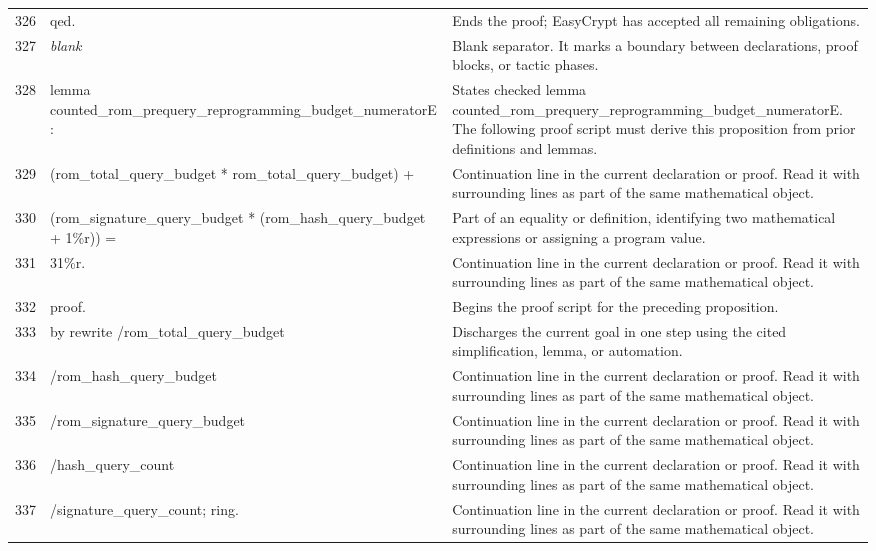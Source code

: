 \documentclass[10pt]{article}
\begin{document}
\begin{longtable}{r L{0.53\textwidth} L{0.37\textwidth}}
326 & {\ttfamily\scriptsize qed.} & Ends the proof; EasyCrypt has accepted all remaining obligations. \\
327 & {\ttfamily\scriptsize \emph{blank}} & Blank separator.  It marks a boundary between declarations, proof blocks, or tactic phases. \\
328 & {\ttfamily\scriptsize lemma counted\_rom\_prequery\_reprogramming\_budget\_numeratorE :} & States checked lemma counted\_rom\_prequery\_reprogramming\_budget\_numeratorE.  The following proof script must derive this proposition from prior definitions and lemmas. \\
329 & {\ttfamily\scriptsize   (rom\_total\_query\_budget * rom\_total\_query\_budget) +} & Continuation line in the current declaration or proof.  Read it with surrounding lines as part of the same mathematical object. \\
330 & {\ttfamily\scriptsize   (rom\_signature\_query\_budget * (rom\_hash\_query\_budget + 1\%r)) =} & Part of an equality or definition, identifying two mathematical expressions or assigning a program value. \\
331 & {\ttfamily\scriptsize   31\%r.} & Continuation line in the current declaration or proof.  Read it with surrounding lines as part of the same mathematical object. \\
332 & {\ttfamily\scriptsize proof.} & Begins the proof script for the preceding proposition. \\
333 & {\ttfamily\scriptsize by rewrite /rom\_total\_query\_budget} & Discharges the current goal in one step using the cited simplification, lemma, or automation. \\
334 & {\ttfamily\scriptsize            /rom\_hash\_query\_budget} & Continuation line in the current declaration or proof.  Read it with surrounding lines as part of the same mathematical object. \\
335 & {\ttfamily\scriptsize            /rom\_signature\_query\_budget} & Continuation line in the current declaration or proof.  Read it with surrounding lines as part of the same mathematical object. \\
336 & {\ttfamily\scriptsize            /hash\_query\_count} & Continuation line in the current declaration or proof.  Read it with surrounding lines as part of the same mathematical object. \\
337 & {\ttfamily\scriptsize            /signature\_query\_count; ring.} & Continuation line in the current declaration or proof.  Read it with surrounding lines as part of the same mathematical object. \\

\end{longtable}
\end{document}
